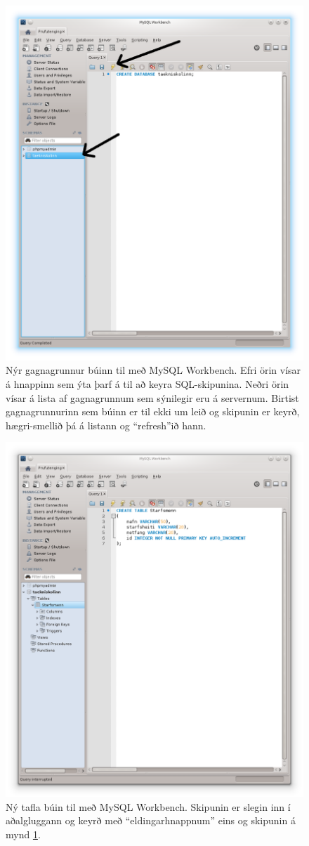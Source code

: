 \begin{figure}
\caption[Nýr gagnagrunnur]{Nýr gagnagrunnur búinn til með MySQL Workbench. Efri örin vísar á hnappinn sem ýta þarf á til að keyra SQL-skipunina. Neðri örin vísar á lista af gagnagrunnum sem sýnilegir eru á servernum. Birtist gagnagrunnurinn sem búinn er til ekki um leið og skipunin er keyrð, hægri-smellið þá á listann og ``refresh''ið hann.}
\label{mynd:workbench-create-db}
\centering
\includegraphics[width=0.8\linewidth]{myndir/workbench-create-db}
\end{figure}

\begin{figure}
\caption[Ný tafla]{Ný tafla búin til með MySQL Workbench. Skipunin er slegin inn í aðalgluggann og keyrð með ``eldingarhnappnum'' eins og skipunin á mynd \ref{mynd:workbench-create-db}.}
\label{mynd:workbench-create-table}
\centering
\includegraphics[width=0.8\linewidth]{myndir/workbench-create-table}
\end{figure}

